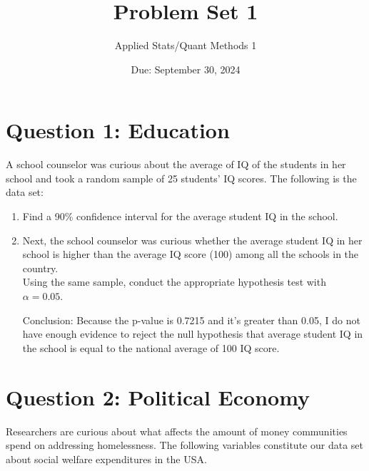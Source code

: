 \documentclass[12pt,letterpaper]{article}
\title{Problem Set 1}
\date{Due: September 30, 2024}
\author{Applied Stats/Quant Methods 1}
\begin{document}
	\maketitle
	
	
	\vspace{.2cm}
	\section*{Question 1: Education}
	\vspace{.2cm}
A school counselor was curious about the average of IQ of the students in her school and took a random sample of 25 students' IQ scores. The following is the data set:\\


  

\vspace{.1cm}

\begin{enumerate}
	\item Find a 90\% confidence interval for the average student IQ in the school.\\
	
	  
	
	\vspace{.1cm}
	
	\item Next, the school counselor was curious  whether  the average student IQ in her school is higher than the average IQ score (100) among all the schools in the country.\\ 
	
	\noindent Using the same sample, conduct the appropriate hypothesis test with $\alpha=0.05$.

\vspace{.1cm}

  
	\vspace{.1cm}
Conclusion:
Because the p-value is 0.7215 and it's greater than 0.05, I do not have enough evidence to reject the null hypothesis that average student IQ in the school is equal to the national average of 100 IQ score.


\end{enumerate}

	\vspace{.5cm}


	\section*{Question 2: Political Economy}
	\vspace{.2cm}
\noindent Researchers are curious about what affects the amount of money communities spend on addressing homelessness. The following variables constitute our data set about social welfare expenditures in the USA. \\
\vspace{.5cm}
\end{document}
